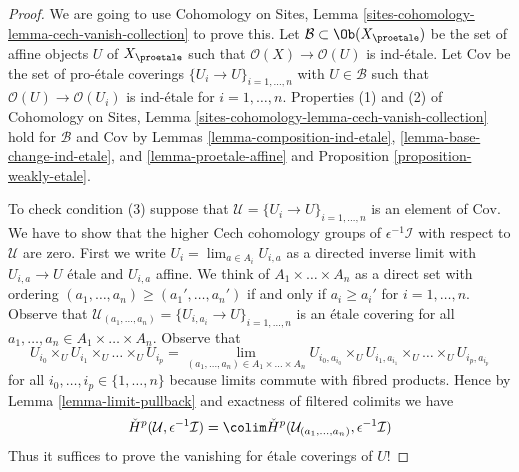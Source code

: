 \begin{proof}
We are going to use
Cohomology on Sites, Lemma \ref{sites-cohomology-lemma-cech-vanish-collection}
to prove this. Let $\mathcal{B} \subset \Ob(X_\proetale)$ be the set of affine
objects $U$ of $X_\proetale$ such that $\mathcal{O}(X) \to \mathcal{O}(U)$ is
ind-\'etale. Let $\text{Cov}$ be the set of pro-\'etale coverings
$\{U_i \to U\}_{i = 1, \ldots, n}$ with $U \in \mathcal{B}$ such that
$\mathcal{O}(U) \to \mathcal{O}(U_i)$ is ind-\'etale for $i = 1, \ldots, n$.
Properties (1) and (2) of
Cohomology on Sites, Lemma \ref{sites-cohomology-lemma-cech-vanish-collection}
hold for $\mathcal{B}$ and $\text{Cov}$ by
Lemmas \ref{lemma-composition-ind-etale},
\ref{lemma-base-change-ind-etale}, and
\ref{lemma-proetale-affine} and
Proposition \ref{proposition-weakly-etale}.

\medskip\noindent
To check condition (3) suppose that
$\mathcal{U} = \{U_i \to U\}_{i = 1, \ldots, n}$
is an element of $\text{Cov}$. We have to show that the higher
Cech cohomology groups of $\epsilon^{-1}\mathcal{I}$
with respect to $\mathcal{U}$ are zero.
First we write $U_i = \lim_{a \in A_i} U_{i, a}$ as a directed inverse limit
with $U_{i, a} \to U$ \'etale and $U_{i, a}$ affine.
We think of $A_1 \times \ldots \times A_n$ as a direct set
with ordering $(a_1, \ldots, a_n) \geq (a_1', \ldots, a_n')$
if and only if $a_i \geq a_i'$ for $i = 1, \ldots, n$.
Observe that
$\mathcal{U}_{(a_1, \ldots, a_n)} = \{U_{i, a_i} \to U\}_{i = 1, \ldots, n}$
is an \'etale covering for all
$a_1, \ldots, a_n \in A_1 \times \ldots \times A_n$.
Observe that
$$
U_{i_0} \times_U U_{i_1} \times_U \ldots \times_U U_{i_p}
=
\lim_{(a_1, \ldots, a_n) \in A_1 \times \ldots \times A_n}
U_{i_0, a_{i_0}} \times_U
U_{i_1, a_{i_1}} \times_U \ldots \times_U U_{i_p, a_{i_p}}
$$
for all $i_0, \ldots, i_p \in \{1, \ldots, n\}$ because limits
commute with fibred products. Hence by Lemma \ref{lemma-limit-pullback}
and exactness of filtered colimits we have
$$
\check{H}^p(\mathcal{U}, \epsilon^{-1}\mathcal{I}) =
\colim \check{H}^p(\mathcal{U}_{(a_1, \ldots, a_n)}, \epsilon^{-1}\mathcal{I}) 
$$
Thus it suffices to prove the vanishing for \'etale coverings
of $U$!


\end{proof}
